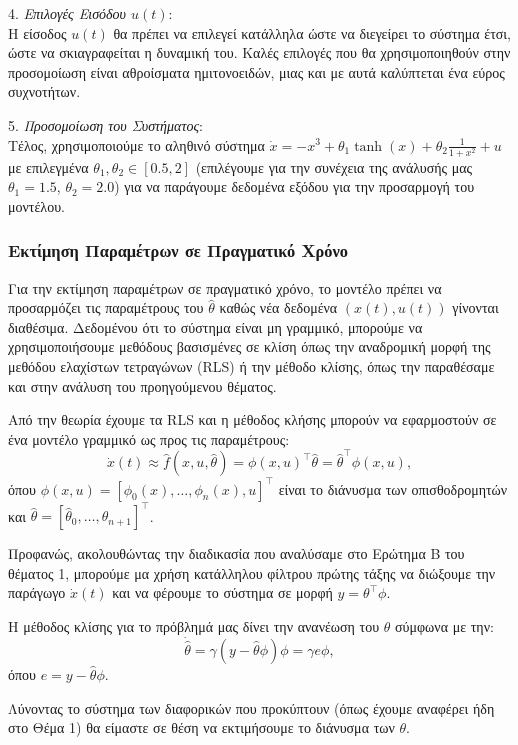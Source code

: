 \documentclass[12pt]{article} %
\numberwithin{equation}{section}  %
\begin{document}
4. \textit{Επιλογές Εισόδου \(u(t)\)}: \\ 
Η είσοδος \(u(t)\) θα πρέπει να επιλεγεί κατάλληλα ώστε να διεγείρει το σύστημα έτσι, ώστε να σκιαγραφείται η δυναμική του. 
Καλές επιλογές που θα χρησιμοποιηθούν στην προσομοίωση είναι αθροίσματα ημιτονοειδών, μιας και με αυτά καλύπτεται ένα εύρος συχνοτήτων. 

5. \textit{Προσομοίωση του Συστήματος}: \\
Τέλος, χρησιμοποιούμε το αληθινό σύστημα \(\dot{x} = -x^3 + \theta_1 \tanh(x) + \theta_2 \frac{1}{1+x^2} + u\) με επιλεγμένα \(\theta_1, \theta_2 \in [0.5, 2]\) (επιλέγουμε για την συνέχεια της ανάλυσής μας \(\theta_1 = 1.5\), \(\theta_2 = 2.0\)) 
για να παράγουμε δεδομένα εξόδου για την προσαρμογή του μοντέλου. 


\subsubsection{Εκτίμηση Παραμέτρων σε Πραγματικό Χρόνο}

Για την εκτίμηση παραμέτρων σε πραγματικό χρόνο, το μοντέλο πρέπει να προσαρμόζει τις παραμέτρους του \(\hat{\theta}\) καθώς νέα δεδομένα \((x(t), u(t))\) γίνονται διαθέσιμα. 
Δεδομένου ότι το σύστημα είναι μη γραμμικό, μπορούμε να χρησιμοποιήσουμε μεθόδους βασισμένες σε κλίση όπως την αναδρομική μορφή της μεθόδου ελαχίστων τετραγώνων (RLS) ή την μέθοδο κλίσης, όπως την παραθέσαμε και στην ανάλυση του προηγούμενου θέματος.

Από την θεωρία έχουμε τα RLS και η μέθοδος κλήσης μπορούν να εφαρμοστούν σε ένα μοντέλο γραμμικό ως προς τις παραμέτρους:
\[
\dot{x}(t) \approx \hat{f}(x, u, \hat{\theta}) = \phi(x, u)^{\top} \hat{\theta} = \hat{\theta}^{\top} \phi(x, u),
\]
όπου \(\phi(x, u) = [\phi_0(x), \dots, \phi_n(x), u]^{\top}\) είναι το διάνυσμα των οπισθοδρομητών και \(\hat{\theta} = [\hat{\theta}_0, \dots, \hat{\theta}_{n+1}]^{\top}\). 

Προφανώς, ακολουθώντας την διαδικασία που αναλύσαμε στο Ερώτημα Β του θέματος 1, μπορούμε μα χρήση κατάλληλου φίλτρου πρώτης τάξης να διώξουμε την παράγωγο $\dot{x}(t)$ και να φέρουμε το σύστημα σε μορφή $y = \theta^{\top} \phi$.

H μέθοδος κλίσης για το πρόβλημά μας δίνει την ανανέωση του $\theta$ σύμφωνα με την:
\[
\dot{\hat{\theta}} = \gamma (y - \hat\theta \phi) \phi = \gamma e \phi,
\]
όπου \(e =  y - \hat\theta \phi\).

Λύνοντας το σύστημα των διαφορικών που προκύπτουν (όπως έχουμε αναφέρει ήδη στο Θέμα 1) θα είμαστε σε θέση να εκτιμήσουμε το διάνυσμα των $\theta$.
\end{document}
